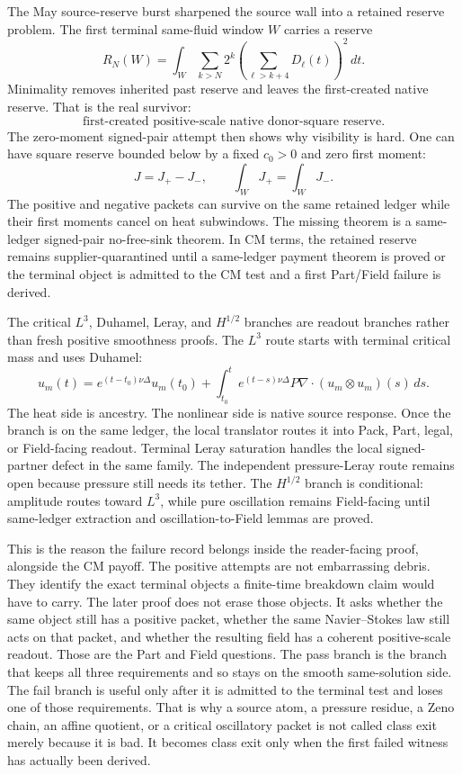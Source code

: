 The May source-reserve burst sharpened the source wall into a retained reserve
problem.
The first terminal same-fluid window \(W\) carries a reserve
\[
  R_N(W)
  =
  \int_W\sum_{k>N}2^k
  \left(\sum_{\ell>k+4}D_\ell(t)\right)^2\,dt .
\]
Minimality removes inherited past reserve and leaves the first-created native
reserve.
That is the real survivor:
\[
  \text{first-created positive-scale native donor-square reserve}.
\]
The zero-moment signed-pair attempt then shows why visibility is hard.
One can have square reserve bounded below by a fixed \(c_0>0\) and zero first
moment:
\[
  J=J_+-J_-,
  \qquad
  \int_WJ_+=\int_WJ_- .
\]
The positive and negative packets can survive on the same retained ledger while
their first moments cancel on heat subwindows.
The missing theorem is a same-ledger signed-pair no-free-sink theorem.
In CM terms, the retained reserve remains supplier-quarantined until a
same-ledger payment theorem is proved or the terminal object is admitted to the
CM test and a first Part/Field failure is derived.

The critical \(L^3\), Duhamel, Leray, and \(H^{1/2}\) branches are readout
branches rather than fresh positive smoothness proofs.
The \(L^3\) route starts with terminal critical mass and uses Duhamel:
\[
  u_m(t)
  =
  e^{(t-t_0)\nu\Delta}u_m(t_0)
  +
  \int_{t_0}^{t}
  e^{(t-s)\nu\Delta}
  P\nabla\cdot(u_m\otimes u_m)(s)\,ds .
\]
The heat side is ancestry.
The nonlinear side is native source response.
Once the branch is on the same ledger, the local translator routes it into
Pack, Part, legal, or Field-facing readout.
Terminal Leray saturation handles the local signed-partner defect in the same
family.
The independent pressure-Leray route remains open because pressure still needs
its tether.
The \(H^{1/2}\) branch is conditional: amplitude routes toward \(L^3\), while
pure oscillation remains Field-facing until same-ledger extraction and
oscillation-to-Field lemmas are proved.

This is the reason the failure record belongs inside the reader-facing proof,
alongside the CM payoff.
The positive attempts are not embarrassing debris.
They identify the exact terminal objects a finite-time breakdown claim would
have to carry.
The later proof does not erase those objects.
It asks whether the same object still has a positive packet, whether the same
Navier--Stokes law still acts on that packet, and whether the resulting field
has a coherent positive-scale readout.
Those are the Part and Field questions.
The pass branch is the branch that keeps all three requirements and so
stays on the smooth same-solution side.
The fail branch is useful only after it is admitted to the terminal test and
loses one of those requirements.
That is why a source atom, a pressure residue, a Zeno chain, an affine quotient,
or a critical oscillatory packet is not called class exit merely because it is
bad.
It becomes class exit only when the first failed witness has actually been
derived.

